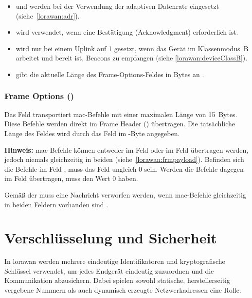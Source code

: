 	\begin{itemize}
		\item {} und  werden bei der Verwendung der adaptiven Datenrate  eingesetzt (siehe~\ref{lorawan:adr}).
		\item {} wird verwendet, wenn eine Bestätigung (Acknowledgment) erforderlich ist.
		\item {} wird nur bei einem Uplink auf 1 gesetzt, wenn das Gerät im Klassenmodus~B arbeitet und bereit ist, Beacons zu empfangen (siehe \ref{lorawan:deviceClassB}).
		\item {} gibt die aktuelle Länge des Frame-Options-Feldes  in Bytes an \cite{LoRaAlliance:2020b}.
	\end{itemize}
	
	\subsubsection{Frame Options ()}
	Das Feld  transportiert \ac{mac}-Befehle mit einer maximalen Länge von 15~Bytes.  
	Diese Befehle werden direkt im Frame Header () übertragen. Die tatsächliche Länge des Feldes wird durch das Feld  im -Byte angegeben.  
	
	\noindent
	\textbf{Hinweis:} \ac{mac}-Befehle können entweder im Feld  oder im Feld  übertragen werden, jedoch niemals gleichzeitig in beiden (siehe~\autoref{lorawan:frmpayload}). Befinden sich die Befehle im Feld , muss das Feld  ungleich 0 sein.  Werden die Befehle dagegen im Feld  übertragen, muss  den Wert 0 haben.  
	
	Gemä{\ss} der  muss eine Nachricht verworfen werden, wenn \ac{mac}-Befehle gleichzeitig in beiden Feldern vorhanden sind \cite{LoRaAlliance:2020b}.
	

\section{Verschlüsselung und Sicherheit}
	In \ac{lorawan} werden mehrere eindeutige Identifikatoren und kryptografische Schlüssel verwendet, um jedes Endgerät eindeutig zuzuordnen und die Kommunikation abzusichern. Dabei spielen sowohl statische, herstellerseitig vergebene Nummern als auch dynamisch erzeugte Netzwerkadressen eine Rolle.
	
